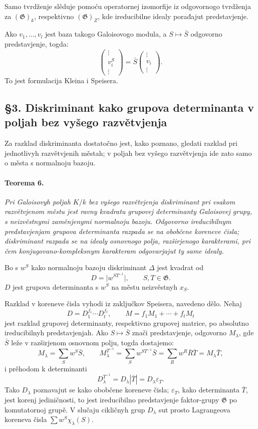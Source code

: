 \documentclass[11pt]{article}
\providecommand{\Gg}{\mathfrak{G}}
\begin{document}
Samo tvrdženje slěduje pomoću operatornej izomorfije iz odgovornogo tvrdženja za \((\Gg)_k\), respektivno \((\Gg)_Z\), kde ireducibilne idealy porađajut predstavjenje.

Ako \(v_1,\ldots,v_l\) jest baza takogo Galoisovogo modula, a \(S\mapsto \bar S\) odgovorno predstavjenje, togda:
\[
        \begin{pmatrix}\vdots\\ v_i^S\\ \vdots\end{pmatrix}
        =\bar S\begin{pmatrix}\vdots\\ v_i\\ \vdots\end{pmatrix}.
\]
To jest formulacija Kleina i Speisera.

\subsection*{§3. Diskriminant kako grupova determinanta v poljah bez vyšego razvětvjenja}

Za razklad diskriminanta dostatočno jest, kako poznano, gledati razklad pri jednotlivyh razvětvjenih městah; v poljah bez vyšego razvětvjenja ide zato samo o města s normalnoju bazoju.

\paragraph{Teorema 6.}
\emph{Pri Galoisovyh poljah \(K/k\) bez vyšego razvětvjenja diskriminant pri vsakom razvětvjenom městu jest ravny kvadratu grupovej determinanty Galoisovej grupy, s neizvěstnymi zaměnjenymi normalnoju bazoju. Odgovorno ireducibilnym predstavjenjam grupova determinanta razpada se na obobčene koreneve čisla; diskriminant razpada se na idealy osnovnogo polja, razširjenogo karakterami, pri čem konjugovano-kompleksnym karakteram odgovarjajut ty same idealy.}

Bo s \(w^S\) kako normalnoju bazoju diskriminant \(\Delta\) jest kvadrat od
\[
        D=\bigl|w^{ST^{-1}}\bigr|,\qquad S,T\in\Gg.
\]
\(D\) jest grupova determinanta s \(w^S\) na městu neizvěstnyh \(x_S\).

Razklad v koreneve čisla vyhodi iz zaključkov Speisera, navedeno dělo. Nehaj
\[
        D=D_1^{f_1}\cdots D_t^{f_t},
        \qquad
        M=f_1M_1+\cdots+f_tM_t
\]
jest razklad grupovej determinanty, respektivno grupovej matrice, po absolutno ireducibilnyh predstavjenjah. Ako \(S\mapsto\bar S\) znači predstavjenje, odgovorno \(M_\lambda\), gde \(\bar S\) leže v razširjenom osnovnom polju, togda dostajemo:
\[
        M_\lambda=\sum_S w^S\bar S,
        \qquad
        M_\lambda^{T^{-1}}=\sum_S w^{ST^{-1}}\bar S
          =\sum_R w^R\bar R\bar T=M_\lambda\bar T,
\]
i prěhodom k determinanti
\[
        D_\lambda^{T^{-1}}=D_\lambda|\bar T|=D_\lambda\varepsilon_T.
\]
Tako \(D_\lambda\) poznavajut se kako obobčene koreneve čisla; \(\varepsilon_T\), kako determinanta \(\bar T\), jest korenj jediničnosti, to jest ireducibilno predstavjenje faktor-grupy \(\Gg\) po komutatornoj grupě. V slučaju cikličnyh grup \(D_\lambda\) sut prosto Lagrangeova koreneva čisla \(\sum w^S\chi_\lambda(S)\).
\end{document}
